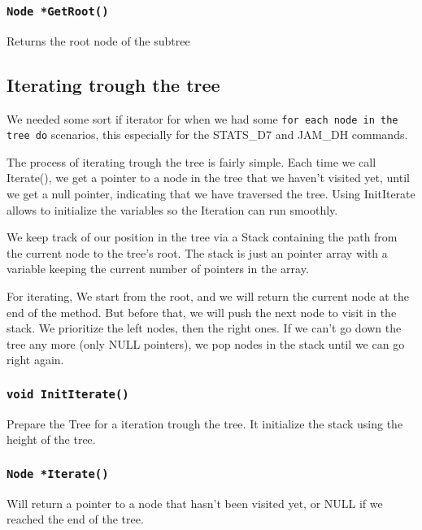 \documentclass[10pt]{article}
\begin{document}
\subsubsection*{\tt Node *GetRoot()}
Returns the root node of the subtree

\subsection{Iterating trough the tree}

We needed some sort if iterator for when we had some \texttt{for each node in the tree do} scenarios, this especially for the STATS\_D7 and JAM\_DH commands.

The process of iterating trough the tree is fairly simple. Each time we call Iterate(), we get a pointer to a node in the tree that we haven’t visited yet, until we get a null pointer, indicating that we have traversed the tree. Using InitIterate allows to initialize the variables so the Iteration can run smoothly.

We keep track of our position in the tree via a Stack containing the path from the current node to the tree's root. The stack is just an pointer array with a variable keeping the current number of pointers in the array.

For iterating, We start from the root, and we will return the current node at the end of the method. But before that, we will push the next node to visit in the stack. We prioritize the left nodes, then the right ones. If we can't go down the tree any more (only NULL pointers), we pop nodes in the stack until we can go right again.

\subsubsection*{\tt void InitIterate()}
Prepare the Tree for a iteration trough the tree. It initialize the stack using the height of the tree.

\subsubsection*{\tt Node *Iterate()}
Will return a pointer to a node that hasn't been visited yet, or NULL if we reached the end of the tree.
 
\end{document}
